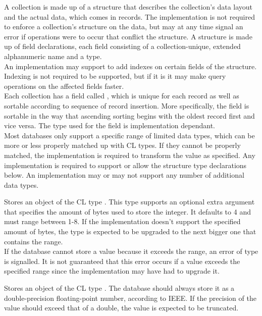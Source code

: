 A collection is made up of a structure that describes the collection's data layout and the actual data, which comes in records. The implementation is not required to enforce a collection's structure on the data, but may at any time signal an error if operations were to occur that conflict the structure. A structure is made up of field declarations, each field consisting of a collection-unique, extended alphanumeric name and a type.\\

An implementation may support to add indexes on certain fields of the structure. Indexing is not required to be supported, but if it is it may make query operations on the affected fields faster. \\

Each collection has a field called , which is unique for each record as well as sortable according to sequence of record insertion. More specifically, the  field is sortable in the way that ascending sorting begins with the oldest record first and vice versa. The type used for the field is implementation dependant. \\

Most databases only support a specific range of limited data types, which can be more or less properly matched up with CL types. If they cannot be properly matched, the implementation is required to transform the value as specified. Any implementation is required to support or allow the structure type declarations below. An implementation may or may not support any number of additional data types. 

Stores an object of the CL type . This type supports an optional extra argument that specifies the amount of bytes used to store the integer. It defaults to 4 and must range between 1-8. If the implementation doesn't support the specified amount of bytes, the type is expected to be upgraded to the next bigger one that contains the range. \\

\noindent If the database cannot store a value because it exceeds the range, an error of type  is signalled. It is not guaranteed that this error occurs if a value exceeds the specified range since the implementation may have had to upgrade it.

Stores an object of the CL type . The database should always store it as a double-precision floating-point number, according to IEEE. If the precision of the value should exceed that of a double, the value is expected to be truncated.

